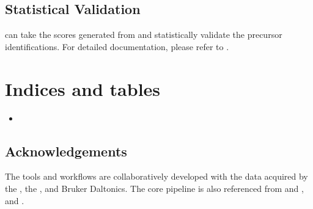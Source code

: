 \documentclass[letterpaper,10pt,english]{sphinxmanual}
\begin{document}
\section{Statistical Validation}
\label{\detokenize{openswath:statistical-validation}}
 can take the scores generated from  and statistically validate
the precursor identifications. For detailed documentation, please refer to .


\chapter{Indices and tables}
\label{\detokenize{index:indices-and-tables}}\begin{itemize}
\item {} 

\end{itemize}


\section{Acknowledgements}
\label{\detokenize{index:acknowledgements}}
The tools and workflows are collaboratively developed with the data acquired
by the  ,
the ,
and Bruker Daltonics. The core pipeline is also referenced from 
and , and .



\renewcommand{\indexname}{Index}
\printindex
\end{document}
